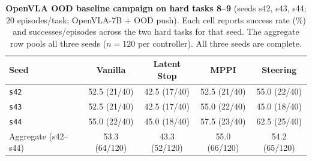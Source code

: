 \begin{table}[t]
\centering
\caption{\textbf{OpenVLA OOD baseline campaign on hard tasks 8--9} (seeds s42, s43, s44; $20$ episodes/task; OpenVLA-7B + OOD push). Each cell reports success rate (\%) and successes/episodes across the two hard tasks for that seed. The aggregate row pools all three seeds ($n{=}120$ per controller). All three seeds are complete.}
\label{tab:openvla_ood_status}
\begin{tabular}{lcccc}
\toprule
Seed & Vanilla & Latent Stop & MPPI & Steering \\
\midrule
\texttt{s42} & 52.5 (21/40) & 42.5 (17/40) & 52.5 (21/40) & 55.0 (22/40) \\
\texttt{s43} & 52.5 (21/40) & 42.5 (17/40) & 55.0 (22/40) & 45.0 (18/40) \\
\texttt{s44} & 55.0 (22/40) & 45.0 (18/40) & 57.5 (23/40) & 62.5 (25/40) \\
\midrule
Aggregate (s42--s44) & 53.3 (64/120) & 43.3 (52/120) & 55.0 (66/120) & 54.2 (65/120) \\
\bottomrule
\end{tabular}
\end{table}
